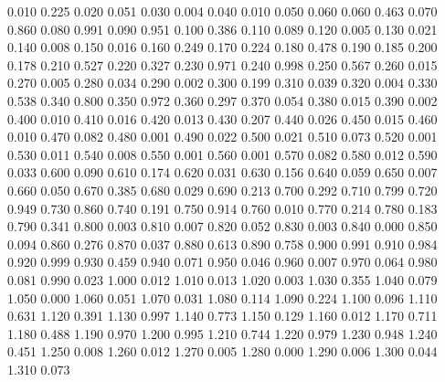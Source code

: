 %
%
0.010 0.225
0.020 0.051
0.030 0.004
0.040 0.010
0.050 0.060
0.060 0.463
0.070 0.860
0.080 0.991
0.090 0.951
0.100 0.386
0.110 0.089
0.120 0.005
0.130 0.021
0.140 0.008
0.150 0.016
0.160 0.249
0.170 0.224
0.180 0.478
0.190 0.185
0.200 0.178
0.210 0.527
0.220 0.327
0.230 0.971
0.240 0.998
0.250 0.567
0.260 0.015
0.270 0.005
0.280 0.034
0.290 0.002
0.300 0.199
0.310 0.039
0.320 0.004
0.330 0.538
0.340 0.800
0.350 0.972
0.360 0.297
0.370 0.054
0.380 0.015
0.390 0.002
0.400 0.010
0.410 0.016
0.420 0.013
0.430 0.207
0.440 0.026
0.450 0.015
0.460 0.010
0.470 0.082
0.480 0.001
0.490 0.022
0.500 0.021
0.510 0.073
0.520 0.001
0.530 0.011
0.540 0.008
0.550 0.001
0.560 0.001
0.570 0.082
0.580 0.012
0.590 0.033
0.600 0.090
0.610 0.174
0.620 0.031
0.630 0.156
0.640 0.059
0.650 0.007
0.660 0.050
0.670 0.385
0.680 0.029
0.690 0.213
0.700 0.292
0.710 0.799
0.720 0.949
0.730 0.860
0.740 0.191
0.750 0.914
0.760 0.010
0.770 0.214
0.780 0.183
0.790 0.341
0.800 0.003
0.810 0.007
0.820 0.052
0.830 0.003
0.840 0.000
0.850 0.094
0.860 0.276
0.870 0.037
0.880 0.613
0.890 0.758
0.900 0.991
0.910 0.984
0.920 0.999
0.930 0.459
0.940 0.071
0.950 0.046
0.960 0.007
0.970 0.064
0.980 0.081
0.990 0.023
1.000 0.012
1.010 0.013
1.020 0.003
1.030 0.355
1.040 0.079
1.050 0.000
1.060 0.051
1.070 0.031
1.080 0.114
1.090 0.224
1.100 0.096
1.110 0.631
1.120 0.391
1.130 0.997
1.140 0.773
1.150 0.129
1.160 0.012
1.170 0.711
1.180 0.488
1.190 0.970
1.200 0.995
1.210 0.744
1.220 0.979
1.230 0.948
1.240 0.451
1.250 0.008
1.260 0.012
1.270 0.005
1.280 0.000
1.290 0.006
1.300 0.044
1.310 0.073
